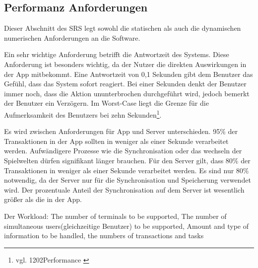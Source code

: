 {		%
	
	\subsection{Performanz Anforderungen}
		Dieser Abschnitt des SRS legt sowohl die statischen als auch die dynamischen numerischen Anforderungen an die Software. 
	
		Ein sehr wichtige Anforderung betrifft die Antwortzeit des Systems. Diese Anforderung ist besonders wichtig, da der Nutzer die direkten Auswirkungen in der App mitbekommt. Eine Antwortzeit von 0,1 Sekunden gibt dem Benutzer das Gefühl, dass das System sofort reagiert. Bei einer Sekunden denkt der Benutzer immer noch, dass die Aktion ununterbrochen durchgeführt wird, jedoch bemerkt der Benutzer ein Verzögern. Im Worst-Case liegt die Grenze für die Aufmerksamkeit des Benutzers bei zehn Sekunden\footnote{vgl. 1202Performance \cite{performance1}}.
		
		Es wird zwischen Anforderungen für App und Server unterschieden. 95\% der Transaktionen in der App sollten in weniger als einer Sekunde verarbeitet werden. Aufwändigere Prozesse wie die Synchronisation oder das wechseln der Spielwelten dürfen signifikant länger brauchen. Für den Server gilt, dass 80\% der Transaktionen in weniger als einer Sekunde verarbeitet werden. Es sind nur 80\% notwendig, da der Server nur für die Synchronisation und Speicherung verwendet wird. Der prozentuale Anteil der Synchronisation auf dem Server ist wesentlich größer als die in der App. 
		
		Der Workload: The number of terminals to be supported, The number of simultaneous users(gleichzeitige Benutzer) to be supported, Amount and type of information to be handled, the numbers of transactions and tasks
		
}
